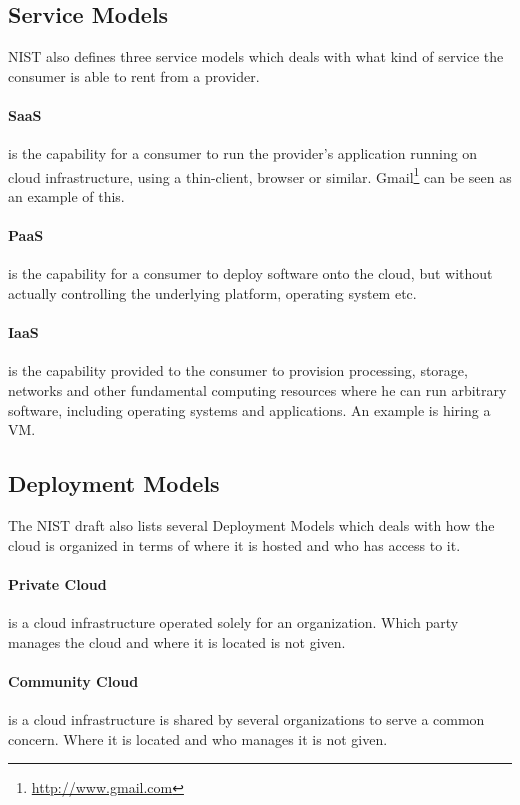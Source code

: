 \documentclass[pdftex,english,10pt,b5paper,twoside]{book}
\begin{document}
\subsection{Service Models}
\ac{NIST} also defines three service models which deals with what kind of
service the consumer is able to rent from a provider.

\paragraph{\ac{SaaS}} is the capability for a consumer to run the provider's
application running on cloud infrastructure, using a thin-client, browser or
similar. Gmail\footnote{\url{http://www.gmail.com}} can be seen as an example
of this.

\paragraph{\ac{PaaS}} is the capability for a consumer to deploy software onto
the cloud, but without actually controlling the underlying platform, operating
system etc.

\paragraph{\ac{IaaS}} is the capability provided to the consumer to provision
processing, storage, networks and other fundamental computing resources where
he can run arbitrary software, including operating systems and applications. An
example is hiring a \ac{VM}.

\subsection{Deployment Models}
The \ac{NIST} draft also lists several Deployment Models which deals with how
the cloud is organized in terms of where it is hosted and who has access to it.

\paragraph{Private Cloud} is a cloud infrastructure operated solely for an
organization. Which party manages the cloud and where it is located is not
given.

\paragraph{Community Cloud} is a cloud infrastructure is shared by several
organizations to serve a common concern. Where it is located and who manages it
is not given.
\end{document}
